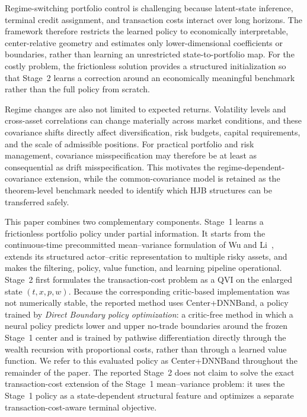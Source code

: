 \documentclass[a4paper,10pt]{article}
\begin{document}
Regime-switching portfolio control is challenging because latent-state
inference, terminal credit assignment, and transaction costs interact over
long horizons. The framework therefore restricts the learned policy to
economically interpretable, center-relative geometry and estimates only
lower-dimensional coefficients or boundaries, rather than learning an
unrestricted state-to-portfolio map. For the costly problem, the frictionless solution provides a structured initialization so that Stage~2 learns a correction around an economically meaningful benchmark rather than the full policy from scratch.

Regime changes are also not limited to expected returns. Volatility levels and cross-asset correlations can change materially across market conditions, and these covariance shifts directly affect diversification, risk budgets, capital requirements, and the scale of admissible positions. For practical portfolio and risk management, covariance misspecification may therefore be at least as consequential as drift misspecification. This motivates the regime-dependent-covariance extension, while the common-covariance model is retained as the theorem-level benchmark needed to identify which HJB structures can be transferred safely.

This paper combines two complementary components. Stage~1 learns a frictionless portfolio policy under partial information. It starts from the continuous-time precommitted mean--variance formulation of Wu and Li~\cite{wu2024}, extends its structured actor--critic representation to multiple risky assets, and makes the filtering, policy, value function, and learning pipeline operational. Stage~2 first formulates the transaction-cost problem as a QVI on the enlarged state $(t,x,p,w)$. Because the corresponding critic-based implementation was not numerically stable, the reported method uses Center+DNNBand, a policy trained by \emph{Direct Boundary policy optimization}: a critic-free method in which a neural policy predicts lower and upper no-trade boundaries around the frozen Stage~1 center and is trained by pathwise differentiation directly through the wealth recursion with proportional costs, rather than through a learned value function. We refer to this evaluated policy as Center+DNNBand throughout the remainder of the paper. The reported Stage~2 does not claim to solve the exact transaction-cost extension of the Stage~1 mean--variance problem: it uses the Stage~1 policy as a state-dependent structural feature and optimizes a separate transaction-cost-aware terminal objective.
\end{document}
